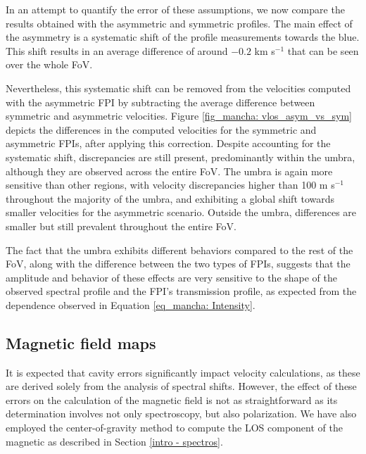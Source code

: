 In an attempt to quantify the error of these assumptions, we now compare the results obtained with the asymmetric and symmetric profiles. The main effect of the asymmetry is a systematic shift of the profile measurements towards the blue. This shift results in an average difference of around $-0.2$ km s$^{-1}$ that can be seen over the whole FoV. 

Nevertheless, this systematic shift can be removed from the velocities computed with the asymmetric FPI by subtracting the average difference between symmetric and asymmetric velocities. Figure \ref{fig_mancha: vlos_asym_vs_sym} depicts the differences in the computed velocities for the symmetric and asymmetric FPIs, after applying this correction. Despite accounting for the systematic shift, discrepancies are still present, predominantly within the umbra, although they are observed across the entire FoV. The umbra is again more sensitive than other regions, with velocity discrepancies higher than 100 m s$^{-1}$ throughout the majority of the umbra, and exhibiting a global shift towards smaller velocities for the asymmetric scenario. Outside the umbra, differences are smaller but still prevalent throughout the entire FoV. 

The fact that the umbra exhibits different behaviors compared to the rest of the FoV, along with the difference between the two types of FPIs, suggests that the amplitude and behavior of these effects are very sensitive to the shape of the observed spectral profile and the FPI's transmission profile, as expected from the dependence observed in Equation \eqref{eq_mancha: Intensity}.  

\subsection{\label{sect: mancha_blos}Magnetic field maps}

It is expected that cavity errors significantly impact velocity calculations, as these are derived solely from the analysis of spectral shifts. However, the effect of these errors on the calculation of the magnetic field is not as straightforward as its determination involves not only spectroscopy, but also polarization. We have also employed the center-of-gravity method to compute the LOS component of the magnetic as described in Section \ref{intro - spectros}. 

